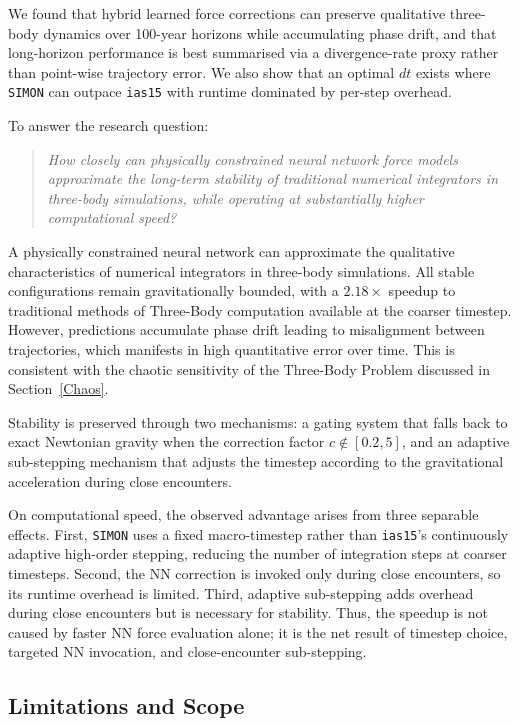 \documentclass[12pt]{article}
\begin{document}
We found that hybrid learned force corrections can preserve qualitative three-body dynamics over 100-year horizons while accumulating phase drift, and that long-horizon performance is best summarised via a divergence-rate proxy rather than point-wise trajectory error. We also show that an optimal $dt$ exists where \texttt{SIMON} can outpace \texttt{ias15} with runtime dominated by per-step overhead.

To answer the research question:
\begin{quote}
\emph{How closely can physically constrained neural network force models approximate the long-term stability of traditional numerical integrators in three-body simulations, while operating at substantially higher computational speed?}
\end{quote}

\noindent A physically constrained neural network can approximate the qualitative characteristics of numerical integrators in three-body simulations. All stable configurations remain gravitationally bounded, with a $2.18\times$ speedup to traditional methods of Three-Body computation available at the coarser timestep. However, predictions accumulate phase drift leading to misalignment between trajectories, which manifests in high quantitative error over time. This is consistent with the chaotic sensitivity of the Three-Body Problem discussed in Section~\ref{Chaos}.

Stability is preserved through two mechanisms: a gating system that falls back to exact Newtonian gravity when the correction factor $c \notin [0.2, 5]$, and an adaptive sub-stepping mechanism that adjusts the timestep according to the gravitational acceleration during close encounters.

On computational speed, the observed advantage arises from three separable effects. First, \texttt{SIMON} uses a fixed macro-timestep rather than \texttt{ias15}'s continuously adaptive high-order stepping, reducing the number of integration steps at coarser timesteps. Second, the NN correction is invoked only during close encounters, so its runtime overhead is limited. Third, adaptive sub-stepping adds overhead during close encounters but is necessary for stability. Thus, the speedup is not caused by faster NN force evaluation alone; it is the net result of timestep choice, targeted NN invocation, and close-encounter sub-stepping.

\subsection{Limitations and Scope}
\end{document}

